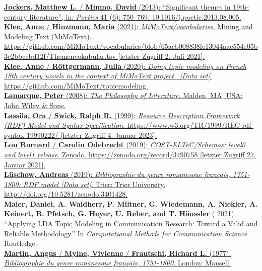 \documentclass[
  12pt,
  letterpaper,
  DIV=11,
  numbers=noendperiod]{scrreprt}
\begin{document}
\href{https://www.zotero.org/google-docs/?fqBRoB}{\textbf{Jockers,
Matthew L.} / \textbf{Mimno, David} (2013): ``Significant themes in
19th-century literature'', in: \emph{Poetics} 41 (6): 750--769.
10.1016/j.poetic.2013.08.005.}\\
\href{https://www.zotero.org/google-docs/?fqBRoB}{\textbf{Klee, Anne} /
\textbf{Hinzmann, Maria} (2021): \emph{MiMoText/vocabularies}. Mining
and Modeling Text (MiMoText).
https://github.com/MiMoText/vocabularies/blob/65acb008838fc13044aac554e05b3c2bbccbd12f/Themenvokabular.tsv
{[}letzter Zugriff 2. Juli 2021{]}.}\\
\href{https://www.zotero.org/google-docs/?fqBRoB}{\textbf{Klee, Anne} /
\textbf{Röttgermann, Julia} (2020): \emph{Doing topic modeling on French
18th century novels in the context of MiMoText project~ {[}Data set{]}}.
https://github.com/MiMoText/topicmodeling.}\\
\href{https://www.zotero.org/google-docs/?fqBRoB}{\textbf{Lamarque,
Peter} (2008): \emph{The Philosophy of Literature}. Malden, MA, USA:
John Wiley \& Sons.}\\
\href{https://www.zotero.org/google-docs/?fqBRoB}{\textbf{Lassila, Ora}
/ \textbf{Swick, Ralph R.} (1999): \emph{Resource Description Framework
(RDF) Model and Syntax Specification}.
https://www.w3.org/TR/1999/REC-rdf-syntax-19990222/ {[}letzter Zugriff
4. Januar 2023{]}.}\\
\href{https://www.zotero.org/google-docs/?fqBRoB}{\textbf{Lou Burnard} /
\textbf{Carolin Odebrecht} (2019): \emph{COST-ELTeC/Schemas: level0 and
level1 release}. Zenodo. https://zenodo.org/record/3490758 {[}letzter
Zugriff 27. Januar 2021{]}.}\\
\href{https://www.zotero.org/google-docs/?fqBRoB}{\textbf{Lüschow,
Andreas} (2019): \emph{Bibliographie du genre romanesque français,
1751-1800: RDF model {[}Data set{]}}. Trier: Trier University.}
\url{http://doi.org/10.5281/zenodo.3401428}\href{https://www.zotero.org/google-docs/?fqBRoB}{.}\\
\textbf{Maier, Daniel, A. Waldherr, P. Miltner, G. Wiedemann, A.
Niekler, A. Keinert, B. Pfetsch, G. Heyer, U. Reber, and T. Häussler} (
2021) ``Applying LDA Topic Modeling in Communication Research: Toward a
Valid and Reliable Methodology.'' In \emph{Computational Methods for
Communication Science}. Routledge.\\
\href{https://www.zotero.org/google-docs/?fqBRoB}{\textbf{Martin, Angus}
/ \textbf{Mylne, Vivienne} / \textbf{Frautschi, Richard L.} (1977):
\emph{Bibliographie du genre romanesque français, 1751-1800}. London:
Mansell.}\\
\end{document}
